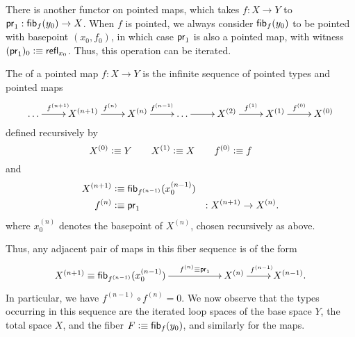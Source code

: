 There is another functor on pointed maps, which takes $f:X\to Y$ to $\mathsf{pr}_{1} : {\mathsf{fib}}_{f}(y_0) \to X$.
When $f$ is pointed, we always consider ${\mathsf{fib}}_{f}(y_0)$ to be pointed with basepoint $(x_0,f_0)$, in which case $\mathsf{pr}_{1}$ is also a pointed map, with witness $(\mathsf{pr}_{1})_0 \vcentcolon\equiv \mathsf{refl}_{x_0}$.
Thus, this operation can be iterated.

\begin{defn}
  The 
  of a pointed map $f:X\to Y$ is the infinite sequence of pointed types and pointed maps
  \[\xymatrix{\dots \ar[r]^{f^{(n+1)}} & X^{(n+1)} \ar[r]^{f^{(n)}} & X^{(n)} \ar^-{f^{(n-1)}}[r] & \dots \ar[r] & X^{(2)} \ar^-{f^{(1)}}[r] & X^{(1)} \ar[r]^{f^{(0)}} & X^{(0)}}\]
  defined recursively by
  \[ X^{(0)} \vcentcolon\equiv Y\qquad
    X^{(1)} \vcentcolon\equiv X\qquad
    f^{(0)} \vcentcolon\equiv f\qquad
    \]
  and
  \begin{alignat*}{2}
    X^{(n+1)} &\vcentcolon\equiv {\mathsf{fib}}_{f^{(n-1)}}(x^{(n-1)}_0)\\
    f^{(n)} &\vcentcolon\equiv \mathsf{pr}_{1} &: X^{(n+1)} \to X^{(n)}.
  \end{alignat*}
  where $x^{(n)}_0$ denotes the basepoint of $X^{(n)}$, chosen recursively as above.
\end{defn}

Thus, any adjacent pair of maps in this fiber sequence is of the form
\[ \xymatrix{ X^{(n+1)} \jdeq \hfib{f^{(n-1)}}{x^{(n-1)}_0} \ar[rr]^-{f^{(n)}\jdeq \proj1} && X^{(n)} \ar[r]^{f^{(n-1)}} & X^{(n-1)}. } \]
In particular, we have $f^{(n-1)} \circ f^{(n)} = 0$.
We now observe that the types occurring in this sequence are the iterated loop spaces of the base
space $Y$, the total space $X$, and the fiber $F\vcentcolon\equiv {\mathsf{fib}}_{f}(y_0)$, and similarly for the maps.

